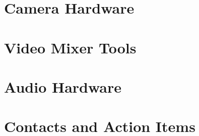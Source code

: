 \documentclass[aspectratio=169]{beamer}
\begin{document}

% 


\section{Camera Hardware}

% 



\section{Video Mixer Tools}



\section{Audio Hardware}




\section{Contacts and Action Items}

% 
% 


\end{document}
